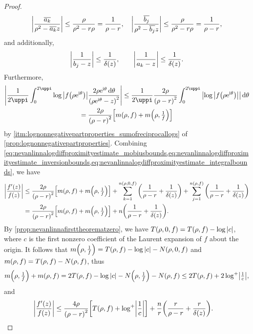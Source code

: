 \begin{proof}
    \begin{equation}
        \abs{\frac{\overline{a_k}}{\rho^2-\overline{a_k}z}}\leq\frac{\rho}{\rho^2-r\rho}=\frac1{\rho-r},\quad\abs{\frac{\overline{b_j}}{\rho^2-\overline{b_j}z}}\leq\frac{\rho}{\rho^2-r\rho}=\frac1{\rho-r},\label{eq:nevanlinnalogdiffproximityestimate_mobiusbounds}
    \end{equation} and additionally,
    \begin{equation}
        \abs{\frac1{b_j-z}}\leq\frac1{\delta(z)},\qquad\abs{\frac1{a_k-z}}\leq\frac1{\delta(z)}.\label{eq:nevanlinnalogdiffproximityestimate_inversionbounds}
    \end{equation}
    Furthermore,
    \begin{multline}
        \abs{\frac1{2\uppi}\int_0^{2\uppi}\log\abs{f\qty(\rho\ee^{\ii\theta})}\frac{2\rho\ee^{\ii\theta}\dd{\theta}}{\qty(\rho\ee^{\ii\theta}-z)^2}}\leq\frac1{2\uppi}\frac{2\rho}{\qty(\rho-r)^2}\int_0^{2\uppi}\abs{\log\abs{f\qty(\rho\ee^{\ii\theta})}}\dd{\theta}\\
        =\frac{2\rho}{\qty(\rho-r)^2}\qty[m\qty(\rho,f)+m\qty(\rho,\tfrac1f)]\label{eq:nevanlinnalogdiffproximityestimate_integralbounds}
    \end{multline}
    by \cref{itm:lognonnegativepartproperties_sumofreciprocallogs} of \cref{prop:lognonnegativepartproperties}. Combining \cref{eq:nevanlinnalogdiffproximityestimate_mobiusbounds,eq:nevanlinnalogdiffproximityestimate_inversionbounds,eq:nevanlinnalogdiffproximityestimate_integralbounds}, we have
    \begin{align*}
        \abs{\frac{f'(z)}{f(z)}}&\leq\frac{2\rho}{\qty(\rho-r)^2}\qty[m\qty(\rho,f)+m\qty(\rho,\tfrac1f)]+\sum_{k=1}^{n(\rho,0,f)}\qty(\frac1{\rho-r}+\frac1{\delta(z)})+\sum_{j=1}^{n(\rho,f)}\qty(\frac1{\rho-r}+\frac1{\delta(z)})\\
        &=\frac{2\rho}{\qty(\rho-r)^2}\qty[m\qty(\rho,f)+m\qty(\rho,\tfrac1f)]+n\qty(\frac{1}{\rho-r}+\frac{1}{\delta(z)}).
    \end{align*}
    By \cref{prop:nevanlinnafirsttheorematzero}, we have \(T(\rho,0,f)=T(\rho,f)-\log\abs{c}\), where \(c\) is the first nonzero coefficient of the Laurent expansion of \(f\) about the origin. It follows that \(m\qty(\rho,\tfrac1f)=T(\rho,f)-\log\abs{c}-N\qty(\rho,0,f)\) and \(m\qty(\rho,f)=T(\rho,f)-N\qty(\rho,f)\), thus \[m\qty(\rho,\tfrac1f)+m(\rho,f)=2T(\rho,f)-\log\abs{c}-N\qty(\rho,\tfrac1f)-N\qty(\rho,f)\leq 2T(\rho,f)+2\mathop{\log^+\!}\abs{\tfrac1{c}},\]
    and
    \begin{align*}
        \abs{\frac{f'(z)}{f(z)}}&\leq\frac{4\rho}{\qty(\rho-r)^2}\qty[T(\rho,f)+\logp\abs{\frac1{c}}]+\frac{n}{r}\qty(\frac{r}{\rho-r}+\frac{r}{\delta(z)}).

\end{align*}
\end{proof}
